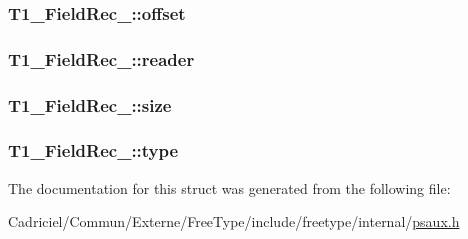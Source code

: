\hypertarget{struct_t1___field_rec___a41b503016f68291e061a2e29498982c1}{
\subsubsection[{offset}]{ T1\-\_\-\-Field\-Rec\-\_\-\-::offset}}\label{struct_t1___field_rec___a41b503016f68291e061a2e29498982c1}
\hypertarget{struct_t1___field_rec___a95e227de47c22bdadd77f797ff43d89d}{
\subsubsection[{reader}]{ T1\-\_\-\-Field\-Rec\-\_\-\-::reader}}\label{struct_t1___field_rec___a95e227de47c22bdadd77f797ff43d89d}
\hypertarget{struct_t1___field_rec___a8ce74a7ad2276abe8942883e7fbb1241}{
\subsubsection[{size}]{ T1\-\_\-\-Field\-Rec\-\_\-\-::size}}\label{struct_t1___field_rec___a8ce74a7ad2276abe8942883e7fbb1241}
\hypertarget{struct_t1___field_rec___ad873155b36b72db9a1feaf2699fed1ce}{
\subsubsection[{type}]{ T1\-\_\-\-Field\-Rec\-\_\-\-::type}}\label{struct_t1___field_rec___ad873155b36b72db9a1feaf2699fed1ce}


The documentation for this struct was generated from the following file\-:\begin{DoxyCompactItemize}
\item 
Cadriciel/\-Commun/\-Externe/\-Free\-Type/include/freetype/internal/\hyperlink{psaux_8h}{psaux.\-h}\end{DoxyCompactItemize}
